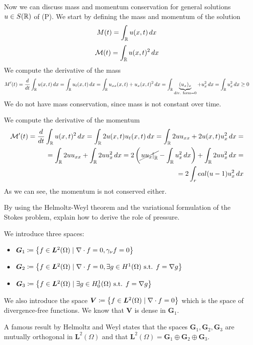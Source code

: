 Now we can discuss mass and momentum conservation for general solutions \(u \in S(\mathbb{R})\) of (P). We start by defining the mass and momentum of the solution
\[
    M(t) = \int_{\mathbb{R}} u(x,t) \, dx
\]
\[
    \mathcal{M}(t) = \int_{\mathbb{R}} u(x,t)^2 \, dx
\]
We compute the derivative of the mass
\[
    \begin{split}
        M'(t) = \frac{d}{dt} \int_{\mathbb{R}} u(x,t) \, dx = \int_{\mathbb{R}} u_t(x,t) \, dx = \int_{\mathbb{R}} u_{xx}(x,t) + u_x(x,t)^2 \, dx = \int_{\mathbb{R}} \underbrace{(u_x)_x}_{\text{div. form} = 0} + u_x^2 \, dx = \int_{\mathbb{R}} u_x^2 \, dx \geq 0
    \end{split}
\]
We do not have mass conservation, since mass is not constant over time. 

We compute the derivative of the momentum
\[
    \begin{split}
        \mathcal{M}'(t) = \frac{d}{dt} \int_{\mathbb{R}} u(x,t)^2 \, dx = \int_{\mathbb{R}} 2 u(x,t) u_t(x,t) \, dx = \int_{\mathbb{R}} 2 u u_{xx} + 2 u(x,t) u_x^2 \, dx =  \\
        = \int_{\mathbb{R}} 2 u u_{xx} + \int_{\mathbb{R}} 2 u u_x^2 \, dx = 2\left(\cancel{\left. u u_x \right|_{\mathbb{R}}} - \int_{\mathbb{R}} u_x^2 \, dx\right) + \int_{\mathbb{R}} 2 u u_x^2 \, dx = \\
        = 2 \int_real (u - 1) u_x^2 \, dx
    \end{split}
\]
As we can see, the momentum is not conserved either.

\newpage
\begin{exercise}
    By using the Helmoltz-Weyl theorem and the variational formulation of the Stokes problem, explain how to derive the role of pressure.
\end{exercise}
\begin{remark}
    We introduce three spaces:
    \begin{itemize}
        \item \(\bm{G}_1 \coloneqq \left\{ f \in \bm{L}^2(\Omega) \mid \nabla \cdot f = 0, \gamma_\nu f = 0 \right\}\)
        \item \(\bm{G}_2 \coloneqq \left\{ f \in \bm{L}^2(\Omega) \mid \nabla \cdot f = 0, \exists g \in H^1(\Omega) \text{ s.t. } f = \nabla g \right\}\)
        \item \(\bm{G}_3 \coloneqq \left\{ f \in \bm{L}^2(\Omega) \mid \exists g \in H^1_0(\Omega) \text{ s.t. } f = \nabla g \right\}\)
    \end{itemize}
    We also introduce the space \(\bm{V} \coloneqq \left\{ f \in \bm{L}^2(\Omega) \mid \nabla \cdot f = 0 \right\}\) which is the space of divergence-free functions.
    We know that \(\bm{V}\) is dense in \(\bm{G}_1\).

    A famous result by Helmoltz and Weyl states that the spaces \(\bm{G}_1, \bm{G}_2, \bm{G}_3\) are mutually orthogonal in \(\bm{L}^2(\Omega)\) and that \(\bm{L}^2(\Omega) = \bm{G}_1 \oplus \bm{G}_2 \oplus \bm{G}_3\).
\end{remark}

